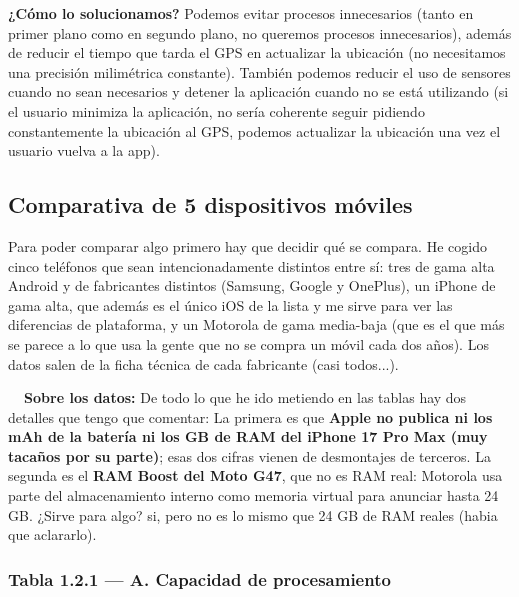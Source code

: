 \documentclass[11pt,a4paper]{article}
\newcommand{\campo}[1]{\textbf{\color{navy}#1}}
\begin{document}
	\campo{¿Cómo lo solucionamos?}
	Podemos evitar procesos innecesarios (tanto en primer plano como en segundo plano, no queremos procesos innecesarios), además de reducir el tiempo que tarda el GPS en actualizar la ubicación (no necesitamos una precisión milimétrica constante). También podemos reducir el uso de sensores cuando no sean necesarios y detener la aplicación cuando no se está utilizando (si el usuario minimiza la aplicación, no sería coherente seguir pidiendo constantemente la ubicación al GPS, podemos actualizar la ubicación una vez el usuario vuelva a la app).
	
	\subsection{Comparativa de 5 dispositivos móviles}
	
	Para poder comparar algo primero hay que decidir qué se compara. He cogido cinco teléfonos que sean intencionadamente distintos entre sí: tres de gama alta Android y de fabricantes distintos (Samsung, Google y OnePlus), un iPhone de gama alta, que además es el único iOS de la lista y me sirve para ver las diferencias de plataforma, y un Motorola de gama media-baja (que es el que más se parece a lo que usa la gente que no se compra un móvil cada dos años). Los datos salen de la ficha técnica de cada fabricante (casi todos...).
	
	\begin{warnbox}
		\textbf{\color{accent!80!black}\faExclamationTriangle\ \ Sobre los datos:}
		De todo lo que he ido metiendo en las tablas hay dos detalles que tengo que comentar:
		La primera es que \textbf{Apple no publica ni los mAh de la batería ni los GB de RAM del
			iPhone 17 Pro Max (muy tacaños por su parte)}; esas dos cifras vienen de desmontajes de terceros.
		La segunda es el \textbf{RAM Boost del Moto G47}, que no es RAM real: Motorola usa parte del
		almacenamiento interno como memoria virtual para anunciar hasta 24 GB. ¿Sirve para algo? si, pero no es lo
		mismo que 24 GB de RAM reales (habia que aclararlo).
	\end{warnbox}
	
	\subsubsection*{Tabla 1.2.1 --- A. Capacidad de procesamiento}
	
\end{document}
